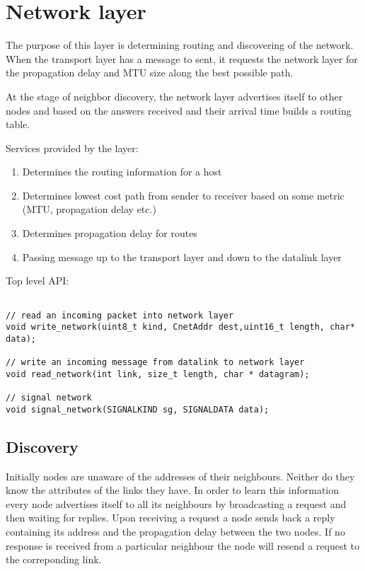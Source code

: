 \documentclass[11pt,a4paper,oneside]{report}
\begin{document}
\section*{Network layer} 
The purpose of this layer is determining routing and discovering of the
network. When the transport layer has a message to sent, it requests the
network layer for the propagation delay and MTU size along the best possible
path. 

At the stage of neighbor discovery, the network layer advertises itself to other
nodes and based on the answers received and their arrival time builds a routing
table.

Services provided by the layer:
\begin{enumerate}
  \item Determines the routing information for a host
  \item Determines lowest cost path from sender to receiver based on some metric
  (MTU, propagation delay etc.)
  \item Determines propagation delay for routes
  \item Passing message up to the transport layer and down to the datalink layer
\end{enumerate}

\newpage
Top level API:
    
   \begin{lstlisting}

// read an incoming packet into network layer
void write_network(uint8_t kind, CnetAddr dest,uint16_t length, char* data);

// write an incoming message from datalink to network layer 
void read_network(int link, size_t length, char * datagram);

// signal network
void signal_network(SIGNALKIND sg, SIGNALDATA data);

  \end{lstlisting}  
           
\subsection*{Discovery}
Initially nodes are unaware of the addresses of their neighbours. Neither do they know the
attributes of the links they have. In order to learn this information every node advertises
itself to all its neighbours by broadcasting a request and then waiting for replies. Upon receiving 
a request a node sends back a reply containing its address and the propagation delay between the
two nodes. If no response is received from a particular neighbour the node will resend a request to the 
correponding link. 
    
\end{document}
